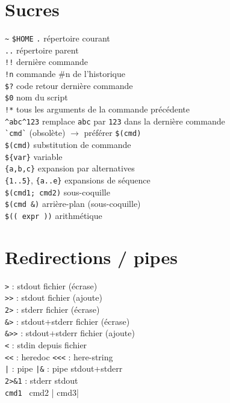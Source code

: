\documentclass[10pt]{article}
\begin{document}
\begin{multicols}{4}
\section*{Sucres}
\lstinline|~| \quad \lstinline|$HOME|
\lstinline|.| \quad répertoire courant \\
\lstinline|..| \quad répertoire parent \\
\lstinline|!!| \quad dernière commande \\
\lstinline|!n| \quad commande \#n de l'historique \\
\lstinline|$?| \quad code retour dernière commande \\
\lstinline|$0| \quad nom du script \\
\lstinline|!*| \quad tous les arguments de la commande précédente \\
\lstinline|^abc^123| \quad remplace \lstinline|abc| par \lstinline|123| dans la dernière commande \\
\lstinline|`cmd`| (obsolète) \(\rightarrow\) préférer \lstinline|$(cmd)| \\
\lstinline|$(cmd)| \quad substitution de commande \\
\lstinline|${var}| \quad variable \\
\lstinline|{a,b,c}| \quad expansion par alternatives \\
\lstinline|{1..5}|, \lstinline|{a..e}| \quad expansions de séquence \\
\lstinline|$(cmd1; cmd2)| \quad sous-coquille \\
\lstinline|$(cmd &)| \quad arrière-plan (sous-coquille) \\
\lstinline|$(( expr ))| \quad arithmétique \\

\section*{Redirections / pipes}
\lstinline|>| : stdout \textrightarrow{} fichier (écrase) \\
\lstinline|>>| : stdout \textrightarrow{} fichier (ajoute) \\
\lstinline|2>| : stderr \textrightarrow{} fichier (écrase) \\
\lstinline|&>| : stdout+stderr \textrightarrow{} fichier (écrase) \\
\lstinline|&>>| : stdout+stderr \textrightarrow{} fichier (ajoute) \\
\lstinline|<| : stdin depuis fichier \\
\lstinline|<<| : heredoc \quad \lstinline|<<<| : here-string \\
\lstinline!|! : pipe \quad \lstinline!|&! : pipe stdout+stderr \\
\lstinline|2>&1| : stderr \textrightarrow{} stdout \\
\lstinline|cmd1 | cmd2 | cmd3| \\


\end{multicols}
\end{document}
